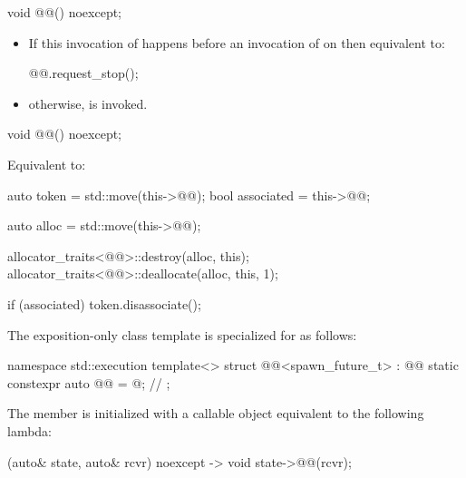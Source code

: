 %
\begin{itemdecl}
void @@() noexcept;
\end{itemdecl}

\begin{itemdescr}
\pnum
\effects
\begin{itemize}
\item
If this invocation of  happens before
an invocation of  on  then
equivalent to:
\begin{codeblock}
@@.request_stop();
\end{codeblock}
\item
otherwise,
 is invoked.
\end{itemize}
\end{itemdescr}

%
\begin{itemdecl}
void @@() noexcept;
\end{itemdecl}

\begin{itemdescr}
\pnum
\effects
Equivalent to:
\begin{codeblock}
auto token = std::move(this->@@);
bool associated = this->@@;

{
  auto alloc = std::move(this->@@);

  allocator_traits<@@>::destroy(alloc, this);
  allocator_traits<@@>::deallocate(alloc, this, 1);
}

if (associated)
  token.disassociate();
\end{codeblock}
\end{itemdescr}

\pnum
The exposition-only class template 
is specialized for  as follows:

%
\begin{codeblock}
namespace std::execution {
  template<>
  struct @@<spawn_future_t> : @@ {
    static constexpr auto @@ = @\seebelow@;                    // \expos
  };
}
\end{codeblock}

\pnum
The member 
is initialized with a callable object equivalent to the following lambda:
\begin{codeblock}
[](auto& state, auto& rcvr) noexcept -> void {
  state->@@(rcvr);
}
\end{codeblock}

